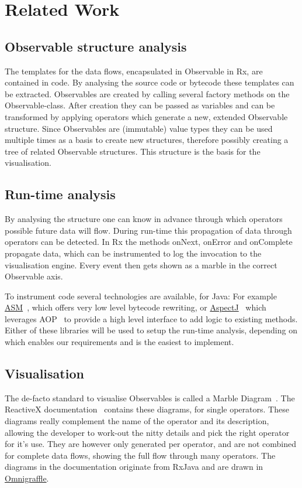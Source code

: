 \section{Related Work}

\subsection{Observable structure analysis} The templates for the data
flows, encapsulated in Observable in Rx, are contained in code.  By
analysing the source code or bytecode these templates can be extracted.
Observables are created by calling several factory methods on the
Observable-class.  After creation they can be passed as variables and
can be transformed by applying operators which generate a new, extended
Observable structure.  Since Observables are (immutable) value types
they can be used multiple times as a basis to create new structures,
therefore possibly creating a tree of related Observable structures.
This structure is the basis for the visualisation.

\subsection{Run-time analysis} By analysing the structure one can know
in advance through which operators possible future data will flow.
During run-time this propagation of data through operators can be
detected.  In Rx the methods onNext, onError and onComplete propagate
data, which can be instrumented to log the invocation to the
visualisation engine.  Every event then gets shown as a marble in the
correct Observable axis.

To instrument code several technologies are available, for Java:  For
example \href{http://asm.ow2.org}{ASM}~\cite{bruneton2002asm,
kuleshov2007using}, which offers very low level bytecode rewriting, or
\href{http://www.eclipse.org/aspectj/}{AspectJ}~\cite{kiczales2001overview}
which leverages AOP~\cite{kiczales1997aspect} to provide a high level
interface to add logic to existing methods.  Either of these libraries
will be used to setup the run-time analysis, depending on which enables
our requirements and is the easiest to implement.

\subsection{Visualisation} The de-facto standard to visualise
Observables is called a Marble Diagram~\cite{c9_marblediagrams}.  The
ReactiveX documentation~\cite{reactivex} contains these diagrams, for
single operators.  These diagrams really complement the name of the
operator and its description, allowing the developer to work-out the
nitty details and pick the right operator for it's use.  They are
however only generated per operator, and are not combined for complete
data flows, showing the full flow through many operators.  The diagrams
in the documentation originate from RxJava and are drawn in \href{https://www.omnigroup.com/omnigraffle}
{Omnigraffle}.

